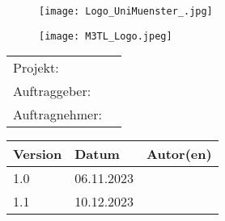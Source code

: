 
\begin{titlepage}

	\begin{figure}[!tbp]
	  \centering
	  \begin{minipage}[b]{0.3\textwidth}
		\texttt{[image: Logo\_UniMuenster\_.jpg]}
	  \end{minipage}
	  \hfill
	  \begin{minipage}[b]{0.3\textwidth}
		\texttt{[image: M3TL\_Logo.jpeg]}
	  \end{minipage}
	\end{figure}
	
	
	\maketitle
	\thispagestyle{empty} %
	
	
	\vspace*{\fill}
	
	  \begin{tabular}[t]{ll}
		Projekt:       & \quad \projektName \\[1.2ex]
		Auftraggeber:  & \quad \auftraggeber\\[1.2ex]
		Auftragnehmer: & \quad \auftragnehmer\\[1.2ex]
	  \end{tabular}
	
	\newpage
	
	\begin{tabular}{|p{3 cm}|p{3 cm}|p{7 cm}|}
	\hline
	\textbf{Version} & \textbf{Datum} & \textbf{Autor(en)} \\
	\hline
	\hline
	1.0 & 06.11.2023 & \authors \\
	\hline
	1.1 & 10.12.2023 & \authors \\
	\hline
	\end{tabular}
	
	\end{titlepage}
	
